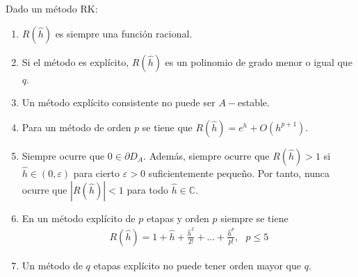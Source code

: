 \begin{obs}
    Dado un método RK:
    \begin{enumerate}
        \item $R(\hat{h})$ es siempre una función racional.
        \item Si el método es explícito, $R(\hat{h})$ es un polinomio de grado menor o igual que $q$.
        \item Un método explícito consistente no puede ser $A-$estable.
        \item Para un método de orden $p$ se tiene que $R(\hat{h}) = e^h + O(h^{p+1})$.
        \item Siempre ocurre que $0 \in \partial D_A$. Además, siempre ocurre que $R(\hat{h}) > 1$ si $\hat{h} \in (0,\varepsilon)$ para cierto $\varepsilon > 0$ suficientemente pequeño. Por tanto, nunca ocurre que $|R(\hat{h})| < 1$ para todo $\hat{h} \in \mathbb{C}$.
        \item En un método explícito de $p$ etapas y orden $p$ siempre se tiene
              \begin{align*}
                  R(\hat{h}) = 1 + \hat{h} + \frac{\hat{h}^2}{2!} + \ldots + \frac{\hat{h}^p}{p!}, \ \ \ p \leq 5
              \end{align*}
        \item Un método de $q$ etapas explícito no puede tener orden mayor que $q$.
    \end{enumerate}
\end{obs}

